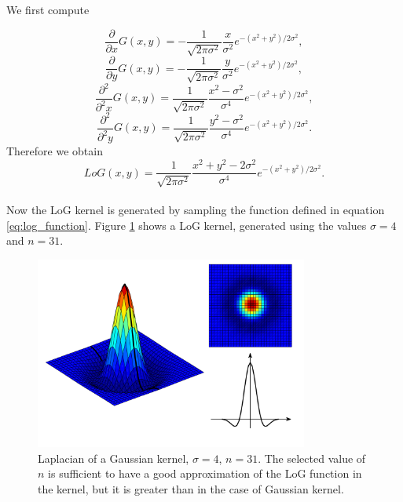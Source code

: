\documentclass{ipol}
\numberwithin{equation}{section}
\numberwithin{table}{section}
\begin{document}
We first compute

\begin{equation} 
	\frac{\partial}{\partial x}G(x,y)=-\frac{1}{\sqrt{2\pi\sigma^2}}\frac{x}{\sigma^2}e^{-(x^2+y^2)/2\sigma^2},
\end{equation}
\begin{equation} 
	\frac{\partial}{\partial y}G(x,y)=-\frac{1}{\sqrt{2\pi\sigma^2}}\frac{y}{\sigma^2}e^{-(x^2+y^2)/2\sigma^2},
\end{equation}
\begin{equation} 
	\frac{\partial^2}{\partial^2 x}G(x,y)=\frac{1}{\sqrt{2\pi\sigma^2}}\frac{x^2-\sigma^2}{\sigma^4}e^{-(x^2+y^2)/2\sigma^2},
\end{equation}
\begin{equation} 
	\frac{\partial^2}{\partial^2 y}G(x,y)=\frac{1}{\sqrt{2\pi\sigma^2}}\frac{y^2-\sigma^2}{\sigma^4}e^{-(x^2+y^2)/2\sigma^2}.
\end{equation}
Therefore we obtain
\begin{equation}
	\label{eq:log_function}
	LoG(x,y)=\frac{1}{\sqrt{2\pi\sigma^2}}\frac{x^2+y^2-2\sigma^2}{\sigma^4}e^{-(x^2+y^2)/2\sigma^2}.
\end{equation}\\

Now the LoG kernel is generated by sampling the function defined in equation \ref{eq:log_function}. 
Figure \ref{fig:log_kernel} shows a LoG kernel, generated using the values $\sigma=4$ and $n=31$.
\myn{\label{math:common:log}} 
\begin{figure}[ht]
	\centering
	\includegraphics[width=0.8\textwidth]{kernel_log.pdf}
	\caption{Laplacian of a Gaussian kernel, $\sigma=4$, $n=31$. The selected value of $n$ is sufficient 
to have a good approximation of the LoG function in the kernel, but it is greater than in the case of 
Gaussian kernel.}
	\label{fig:log_kernel}
\end{figure}
\end{document}
